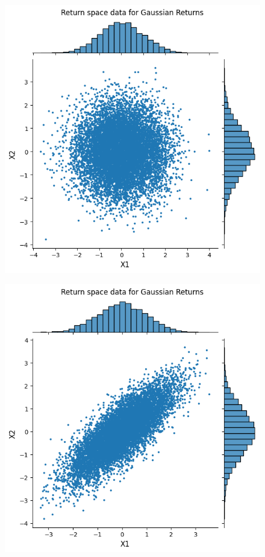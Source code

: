 \begin{figure}
    \centering
    \begin{minipage}{0.4\textwidth}
        \centering
        \includegraphics[width=\textwidth]{3Theory/pictures/IndependentRet.png}
        \label{fig:UncorrelatedScatter}
    \end{minipage}
    \hfill
    \begin{minipage}{0.4\textwidth}
        \centering
        \includegraphics[width=\textwidth]{3Theory/pictures/GaussianRetScatter.png}

\end{minipage}
\end{figure}
